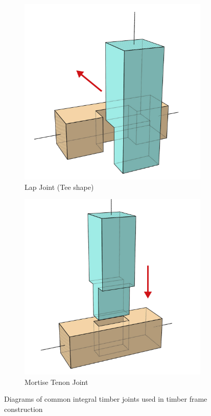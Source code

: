 \begin{figure}[H]
\begin{subfigure}[b]{0.32\textwidth}
         \includegraphics[width=\textwidth]{images/04-1+2/TeeLap_6_witharrows.jpg}
         \caption{Lap Joint (Tee shape)}
         \label{fig:common-joints-teelap}
     \end{subfigure}
     \hfill
     \begin{subfigure}[b]{0.32\textwidth}
         \centering
         \includegraphics[width=\textwidth]{images/04-1+2/Tenon_6_witharrows.jpg}
         \caption{Mortise Tenon Joint}
         \label{fig:common-joints-mortisetenon}
     \end{subfigure}
     \caption{Diagrams of common integral timber joints used in timber frame construction}
     \label{fig:three-common-joints}
\end{figure}

